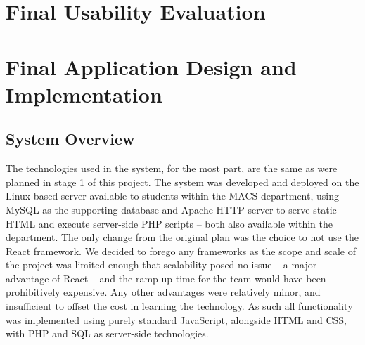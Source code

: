 \documentclass[11pt, oneside, a4paper]{report}   %
\begin{document}
\chapter{Final Usability Evaluation}


\chapter{Final Application Design and Implementation}
\section{System Overview}

The technologies used in the system, for the most part, are the same as were planned in stage 1 of this project. The system was developed and deployed on the Linux-based server available to students within the MACS department, using MySQL as the supporting database and Apache HTTP server to serve static HTML and execute server-side PHP scripts -- both also available within the department. The only change from the original plan was the choice to not use the React framework. We decided to forego any frameworks as the scope and scale of the project was limited enough that scalability posed no issue -- a major advantage of React -- and the ramp-up time for the team would have been prohibitively expensive. Any other advantages were relatively minor, and insufficient to offset the cost in learning the technology. As such all functionality was implemented using purely standard JavaScript, alongside HTML and CSS, with PHP and SQL as server-side technologies.
\end{document}
